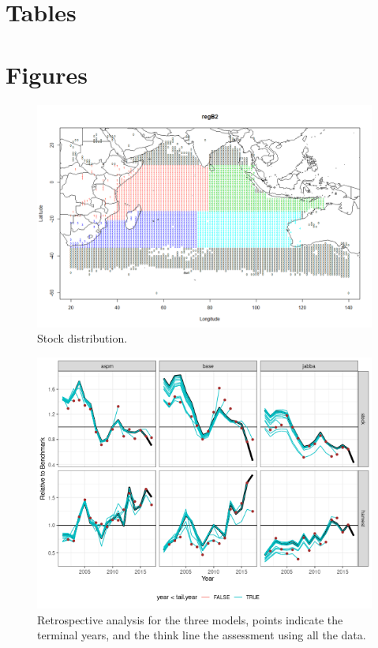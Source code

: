 \documentclass[a4paper]{article}
\begin{document}



\section{Tables}

\section{Figures}

\begin{figure}[htbp]
\centering
\includegraphics[width=6in]{map.png}
\caption{Stock distribution.}
\label{fig:map}
\end{figure}

\begin{figure}[htbp]
\centering
\includegraphics[width=6in]{final-retro-1.png}
\caption{Retrospective analysis for the three models, points indicate the terminal years, and the think line the assessment using all the data.}
\label{fig:retro}
\end{figure}
\end{document}
